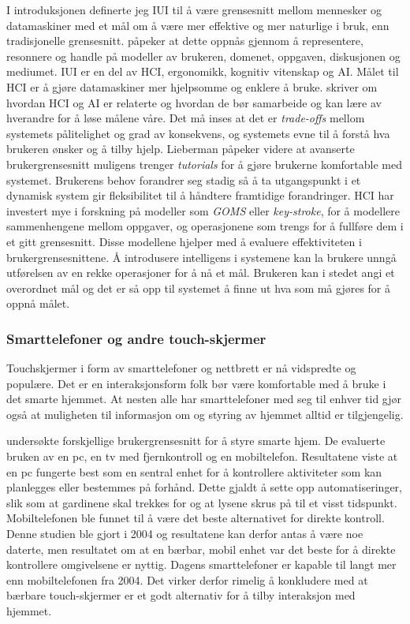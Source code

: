 I introduksjonen definerte jeg IUI til å være grensesnitt mellom mennesker og datamaskiner med et mål om å være mer effektive og mer naturlige i bruk, enn tradisjonelle grensesnitt. \citet{Kaufmann98} påpeker at dette oppnås gjennom å representere, resonnere og handle på modeller av brukeren, domenet, oppgaven, diskusjonen og mediumet. IUI er en del av HCI, ergonomikk, kognitiv vitenskap og AI. Målet til HCI er å gjøre datamaskiner mer hjelpsomme og enklere å bruke. \citet{Lieberman09} skriver om hvordan HCI og AI er relaterte og hvordan de bør samarbeide og kan lære av hverandre for å løse målene våre. Det må inses at det er \emph{trade-offs} mellom systemets pålitelighet og grad av konsekvens, og systemets evne til å forstå hva brukeren ønsker og å tilby hjelp. Lieberman påpeker videre at avanserte brukergrensesnitt muligens trenger \emph{tutorials} for å gjøre brukerne komfortable med systemet. Brukerens behov forandrer seg stadig så å ta utgangspunkt i et dynamisk system gir fleksibilitet til å håndtere framtidige forandringer. HCI har investert mye i forskning på modeller som \emph{GOMS} eller \emph{key-stroke}, for å modellere sammenhengene mellom oppgaver, og operasjonene som trengs for å fullføre dem i et gitt grensesnitt. Disse modellene hjelper med å evaluere effektiviteten i brukergrensesnittene. Å introdusere intelligens i systemene kan la brukere unngå utførelsen av en rekke operasjoner for å nå et mål. Brukeren kan i stedet angi et overordnet mål og det er så opp til systemet å finne ut hva som må gjøres for å oppnå målet.\\

\subsubsection*{Smarttelefoner og andre touch-skjermer}
Touchskjermer i form av smarttelefoner og nettbrett er nå vidspredte og populære. Det er en interaksjonsform folk bør være komfortable med å bruke i det smarte hjemmet. At nesten alle har smarttelefoner med seg til enhver tid gjør også at muligheten til informasjon om og styring av hjemmet alltid er tilgjengelig.

\citet{koskela04} undersøkte forskjellige brukergrensesnitt for å styre smarte hjem. De evaluerte bruken av en pc, en tv med fjernkontroll og en mobiltelefon. Resultatene viste at en pc fungerte best som en sentral enhet for å kontrollere aktiviteter som kan planlegges eller bestemmes på forhånd. Dette gjaldt å sette opp automatiseringer, slik som at gardinene skal trekkes for og at lysene skrus på til et visst tidspunkt. Mobiltelefonen ble funnet til å være det beste alternativet for direkte kontroll. Denne studien ble gjort i 2004 og resultatene kan derfor antas å være noe daterte, men resultatet om at en bærbar, mobil enhet var det beste for å direkte kontrollere omgivelsene er nyttig. Dagens smarttelefoner er kapable til langt mer enn mobiltelefonen fra 2004. Det virker derfor rimelig å konkludere med at bærbare touch-skjermer er et godt alternativ for å tilby interaksjon med hjemmet.\\


